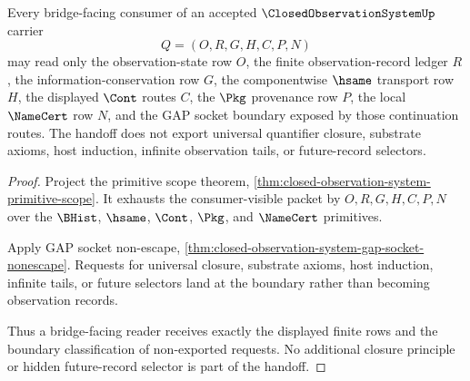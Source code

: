 \begin{theorem}
\label{thm:closed-observation-system-bridge-facing-handoff}
Every bridge-facing consumer of an accepted $\ClosedObservationSystemUp$ carrier
$$
Q=(O,R,G,H,C,P,N)
$$
may read only the observation-state row $O$, the finite observation-record ledger $R$, the information-conservation row $G$, the componentwise $\hsame$ transport row $H$, the displayed $\Cont$ routes $C$, the $\Pkg$ provenance row $P$, the local $\NameCert$ row $N$, and the GAP socket boundary exposed by those continuation routes. The handoff does not export universal quantifier closure, substrate axioms, host induction, infinite observation tails, or future-record selectors.
\end{theorem}
\begin{proof}
Project the primitive scope theorem, \autoref{thm:closed-observation-system-primitive-scope}. It exhausts the consumer-visible packet by $O,R,G,H,C,P,N$ over the $\BHist$, $\hsame$, $\Cont$, $\Pkg$, and $\NameCert$ primitives.

Apply GAP socket non-escape, \autoref{thm:closed-observation-system-gap-socket-nonescape}. Requests for universal closure, substrate axioms, host induction, infinite tails, or future selectors land at the boundary rather than becoming observation records.

Thus a bridge-facing reader receives exactly the displayed finite rows and the boundary classification of non-exported requests. No additional closure principle or hidden future-record selector is part of the handoff.
\end{proof}


\begin{closurestatus}{\ClosedObservationSystemUp}
  \theoryclosure{\matureClosure}
  \formalstatus{\unformalizedV}
\end{closurestatus}

